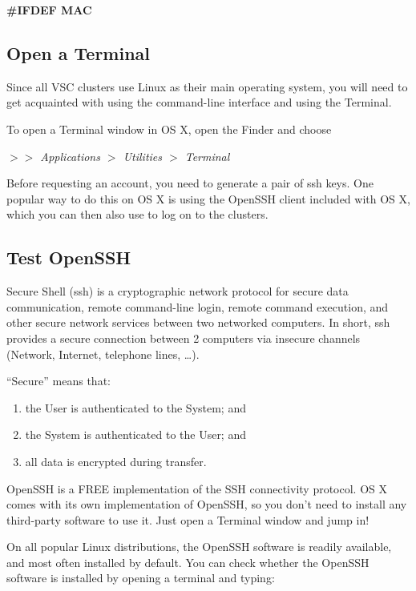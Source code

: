 \textbf{\#IFDEF MAC}


\subsection{Open a Terminal}

Since all VSC clusters use Linux as their main operating system, you will need to get acquainted with using the command-line interface and using the Terminal.



To open a Terminal window in OS X, open the Finder and choose

\textit{$>$$>$ Applications $>$ Utilities $>$ Terminal}



Before requesting an account, you need to generate a pair of ssh keys. One popular way to do this on OS X is using the OpenSSH client included with OS X, which you can then also use to log on to the clusters.


\subsection{Test OpenSSH}

Secure Shell (ssh) is a cryptographic network protocol for secure data communication, remote command-line login, remote command execution, and other secure network services between two networked computers. In short, ssh provides a secure connection between 2 computers via insecure channels (Network, Internet, telephone lines, \ldots).



``Secure'' means that:

\begin{enumerate}
\item  the User is authenticated to the System; and
\item  the System is authenticated to the User; and
\item  all data is encrypted during transfer.
\end{enumerate}

OpenSSH is a FREE implementation of the SSH connectivity protocol. OS X comes with its own implementation of OpenSSH, so you don't need to install any third-party software to use it. Just open a Terminal window and jump in!

On all popular Linux distributions, the OpenSSH software is readily available, and most often installed by default. You can check whether the OpenSSH software is installed by opening a terminal and typing:

